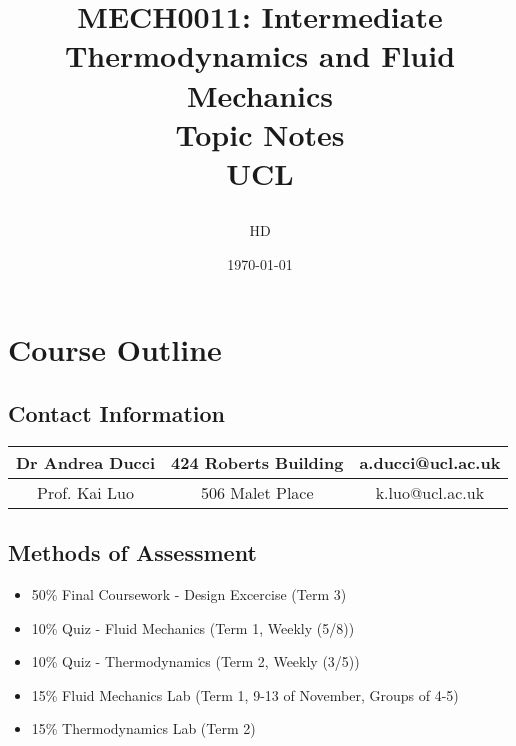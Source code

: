\documentclass[12pt]{report}
\numberwithin{equation}{section}
\begin{document}
\title{
  {MECH0011: Intermediate Thermodynamics and Fluid Mechanics}\\
  \vspace{36pt}
  {\LARGE Topic Notes}\\
  \vspace{28pt}
  {\Large UCL}
  \author{\Large HD}
  \date{\Large \today}
}
\maketitle
\doublespacing
\tableofcontents
\singlespacing

\chapter*{Course Outline}
\section*{Contact Information}
\begin{center}
    \begin{tabular}{ |c|c|c| } 
     \hline
     Dr Andrea Ducci & 424 Roberts Building & a.ducci@ucl.ac.uk \\ 
     \hline
     Prof. Kai Luo & 506 Malet Place & k.luo@ucl.ac.uk \\
     \hline
    \end{tabular}
\end{center}

\section*{Methods of Assessment}
\begin{itemize}[noitemsep]
    \item 50\% Final Coursework - Design Excercise (Term 3)
    \item 10\% Quiz - Fluid Mechanics (Term 1, Weekly (5/8))
    \item 10\% Quiz - Thermodynamics (Term 2, Weekly (3/5))
    \item 15\% Fluid Mechanics Lab (Term 1, 9-13 of November, Groups of 4-5)            
    \item 15\% Thermodynamics Lab (Term 2)
\end{itemize}
\end{document}
